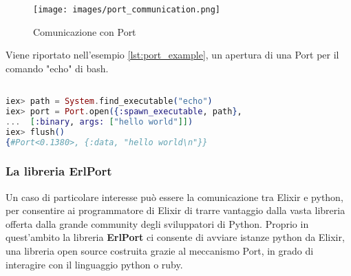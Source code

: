 \begin{figure}[!htp]
    \centering
    \texttt{[image: images/port\_communication.png]}
	\caption{Comunicazione con Port \cite{ErlangPo88:online}}
  	\label{fig:port_communication}
\end{figure}

Viene riportato nell'esempio \ref{lst:port_example},
un apertura di una Port per il comando "echo" di bash.

\begin{lstlisting}[language=elixir,captionpos=b
	caption={Comando echo con Port},label={lst:port_example}]

iex> path = System.find_executable("echo")
iex> port = Port.open({:spawn_executable, path},
...  [:binary, args: ["hello world"]])
iex> flush()
{#Port<0.1380>, {:data, "hello world\n"}}	
\end{lstlisting}

\subsubsection{La libreria ErlPort}
Un caso di particolare interesse può essere la comunicazione
tra Elixir e python, per consentire ai programmatore di Elixir
di trarre vantaggio dalla vasta libreria offerta dalla grande
community degli sviluppatori di Python.
Proprio in quest'ambito la libreria \textbf{ErlPort} ci consente
di avviare istanze python da Elixir, una libreria open source
costruita grazie al meccanismo Port, in grado di interagire con
il linguaggio python o ruby.
